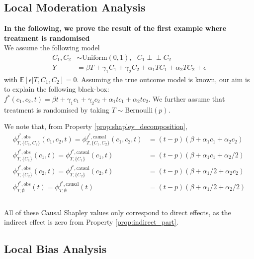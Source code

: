 \documentclass{article}
\theoremstyle{plain}
\theoremstyle{definition}
\theoremstyle{remark}
\theoremstyle{mystyle}
\newcommand{\coalitionshapley}[4]{\phi^{#1}_{#3,#2}(#4)}
\newcommand{\indep}{\perp\!\!\!\!\perp}
\begin{document}
\subsection{Local Moderation Analysis} \label{subsec:local_moderation}

\textbf{In the following, we prove the result of the first example where treatment is randomised} \\
We assume the following model
\begin{align*}
    C_1, C_2 &\sim \text{Uniform}(0,1), \ \ \ C_1 \indep C_2 \\
    Y &= \beta T + \gamma_1C_1 + \gamma_2C_2 + \alpha_1TC_1 + \alpha_2TC_2 + \epsilon
\end{align*}
with $\mathbb{E}[\epsilon|T,C_1,C_2] = 0$. Assuming the true outcome model is known, our aim is to explain the following black-box: $f^*(c_1, c_2, t) = \beta t + \gamma_1c_1 + \gamma_2c_2 + \alpha_1tc_1 + \alpha_2tc_2$. We further assume that treatment is randomised by taking $T \sim \text{Bernoulli}(p)$.

We note that, from Property \ref{prop:shapley_decomposition},
\begin{align*}
\coalitionshapley{f^*,\text{obs}}{\{C_1,C_2\}}{T}{c_1,c_2,t} = \coalitionshapley{f^*,\text{causal}}{\{C_1,C_2\}}{T}{c_1,c_2,t}  &= (t - p)(\beta + \alpha_1c_1 + \alpha_2c_2) \\
    \coalitionshapley{f^*,\text{obs}}{\{C_1\}}{T}{c_1,t} = \coalitionshapley{f^*,\text{causal}}{\{C_1\}}{T}{c_1,t} &= (t - p)(\beta + \alpha_1c_1 + \alpha_2/2) \\
    \coalitionshapley{f^*,\text{obs}}{\{C_2\}}{T}{c_2,t} = \coalitionshapley{f^*,\text{causal}}{\{C_2\}}{T}{c_2,t} &= (t - p)(\beta + \alpha_1/2 + \alpha_2c_2) \\
    \coalitionshapley{f^*,\text{obs}}{\emptyset}{T}{t} = \coalitionshapley{f^*,\text{causal}}{\emptyset}{T}{t} &= (t - p)(\beta + \alpha_1/2 + \alpha_2/2) \\ \\
\end{align*}


All of these Causal Shapley values only correspond to direct effects, as the indirect effect is zero from Property \ref{prop:indirect_part}.

\subsection{Local Bias Analysis}
\label{subsec:local_bias}
\end{document}
